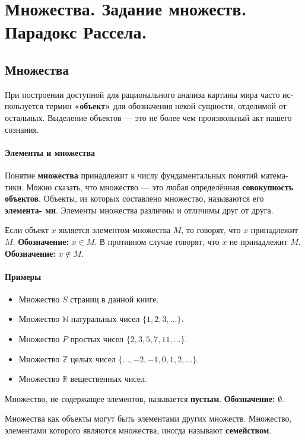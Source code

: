 \section{Множества. Задание множеств. Парадокс Рассела.}

\subsection*{Множества}

При построении доступной для рационального анализа картины мира часто ис-
пользуется термин \textbf{«объект»} для обозначения некой сущности, отделимой от
остальных. Выделение объектов --- это не более чем произвольный акт нашего
сознания.

\paragraph{Элементы и множества}
Понятие \textbf{множества} принадлежит к числу фундаментальных понятий матема-
тики. Можно сказать, что множество --- это любая определённая \textbf{совокупность
объектов}. Объекты, из которых составлено множество, называются его \textbf{элемента-
ми}. Элементы множества различны и отличимы друг от друга.

Если объект $x$ является элементом множества $M$, то говорят, что $x$ принадлежит $M$.
\textbf{Обозначение:} $x \in M$.
В противном случае говорят, что $x$ не принадлежит $M$.
\textbf{Обозначение:} $x \notin M$.

\paragraph{Примеры}
\begin{itemize}
    \item Множество $S$ страниц в данной книге.
    \item Множество $\mathbb{N}$ натуральных чисел $\{1, 2, 3, \ldots\}$.
    \item Множество $P$ простых чисел $\{2, 3, 5, 7, 11, \ldots\}$.
    \item Множество $\mathbb{Z}$ целых чисел $\{\ldots, -2, -1, 0, 1, 2, \ldots\}$.
    \item Множество $\mathbb{R}$ вещественных чисел.
\end{itemize}

Множество, не содержащее элементов, называется \textbf{пустым}. \textbf{Обозначение:} $\emptyset$.

Множества как объекты могут быть элементами других множеств. Множество,
элементами которого являются множества, иногда называют \textbf{семейством}.

